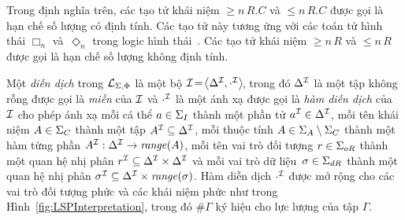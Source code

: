 Trong định nghĩa trên, các tạo tử khái niệm $\geq\!n\,R.C$ và $\leq\!n\,R.C$ được gọi là hạn chế số lượng có định tính. Các tạo tử này tương ứng với các toán tử hình thái $\Box_n$ và~$\Diamond_n$ trong logic hình thái~\cite{Montanari1997,Divroodi2011B}. Các tạo tử khái niệm $\geq\!n\,R$ và $\leq\!n\,R$ được gọi là hạn chế số lượng không định tính.

\begin{Definition}
\label{def:LSPInterpretation}
Một {\em diễn dịch} trong $\mathcal{L}_{\Sigma,\Phi}$ là một bộ \mbox{$\mathcal{I}\!=\! \left\langle\Delta^{\mathcal{I}}, \cdot^{\mathcal{I}}\right\rangle\!$}, trong đó $\Delta^{\mathcal{I}}$ là một tập không rỗng được gọi là {\em miền} của $\mathcal{I}$ và $\cdot^{\mathcal{I}}$ là một ánh xạ được gọi là {\em hàm diễn dịch} của $\mathcal{I}$ cho phép ánh xạ mỗi cá thể $a \in \Sigma_I$ thành một phần tử $a^{\mathcal{I}} \in \Delta^{\mathcal{I}}$, mỗi tên khái niệm $A \in \Sigma_C$ thành một tập $A^{\mathcal{I}} \subseteq \Delta^{\mathcal{I}}$, mỗi thuộc tính $A \in \Sigma_A \setminus \Sigma_C$ thành một hàm từng phần $A^{\mathcal{I}} : \Delta^{\mathcal{I}} \to \mathit{range}(A)$, mỗi tên vai trò đối tượng $r \in \Sigma_{oR}$ thành một quan hệ nhị phân $r^{\mathcal{I}} \subseteq \Delta^{\mathcal{I}} \times \Delta^{\mathcal{I}}$ và mỗi vai trò dữ liệu~$\sigma \in \Sigma_{dR}$ thành một quan hệ nhị phân $\sigma^{\mathcal{I}} \subseteq \Delta^{\mathcal{I}} \times \mathit{range}(\sigma)$.
Hàm diễn dịch $\cdot^{\mathcal{I}}$ được mở rộng cho các vai trò đối tượng phức và các khái niệm phức như trong Hình~\ref{fig:LSPInterpretation}, trong đó $\#\Gamma$ ký hiệu cho lực lượng của tập $\Gamma$.\myend
\end{Definition}

